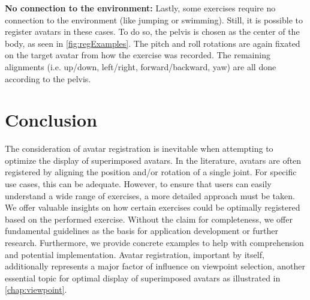 \textbf{No connection to the environment:}
Lastly, some exercises require no connection to the environment (like jumping or swimming). Still, it is possible to register avatars in these cases. To do so, the pelvis is chosen as the center of the body, as seen in \autoref{fig:regExamples}. The pitch and roll rotations are again fixated on the target avatar from how the exercise was recorded. The remaining alignments (i.e. up/down, left/right, forward/backward, yaw) are all done according to the pelvis.

\section{Conclusion}
The consideration of avatar registration is inevitable when attempting to optimize the display of superimposed avatars. In the literature, avatars are often registered by aligning the position and/or rotation of a single joint. For specific use cases, this can be adequate. However, to ensure that users can easily understand a wide range of exercises, a more detailed approach must be taken. We offer valuable insights on how certain exercises could be optimally registered based on the performed exercise. Without the claim for completeness, we offer fundamental guidelines as the basis for application development or further research. Furthermore, we provide concrete examples to help with comprehension and potential implementation. Avatar registration, important by itself, additionally represents a major factor of influence on viewpoint selection, another essential topic for optimal display of superimposed avatars as illustrated in \autoref{chap:viewpoint}.